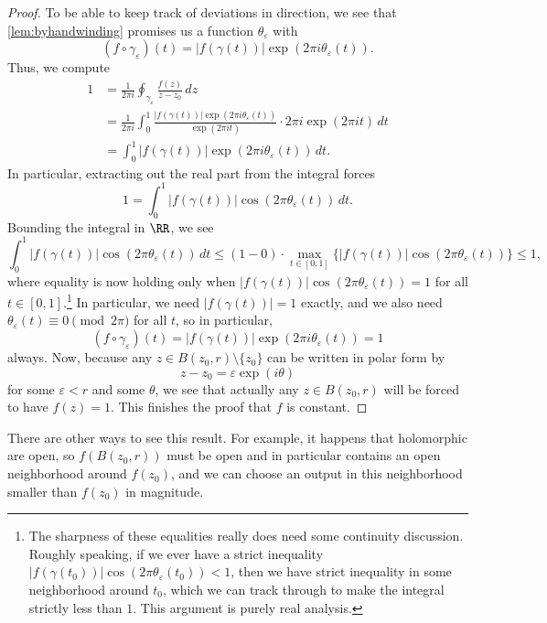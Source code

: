 \documentclass[../notes.tex]{subfiles}
\begin{document}
\begin{proof}
	To be able to keep track of deviations in direction, we see that \autoref{lem:byhandwinding} promises us a function $\theta_\varepsilon$ with
	\[(f\circ\gamma_\varepsilon)(t)=|f(\gamma(t))|\exp(2\pi i\theta_\varepsilon(t)).\]
	Thus, we compute
	\begin{align*}
		1 &= \frac1{2\pi i}\oint_{\gamma_\varepsilon}\frac{f(z)}{z-z_0}\,dz \\
		&= \frac1{2\pi i}\int_0^1\frac{|f(\gamma(t))|\exp(2\pi i\theta_\varepsilon(t))}{\exp(2\pi it)}\cdot2\pi i\exp(2\pi it)\,dt \\
		&= \int_0^1|f(\gamma(t))|\exp(2\pi i\theta_\varepsilon(t))\,dt.
	\end{align*}
	In particular, extracting out the real part from the integral forces
	\[1=\int_0^1|f(\gamma(t))|\cos(2\pi\theta_\varepsilon(t))\,dt.\]
	Bounding the integral in $\RR$, we see
	\[\int_0^1|f(\gamma(t))|\cos(2\pi\theta_\varepsilon(t))\,dt\le(1-0)\cdot\max_{t\in[0,1]}\big\{|f(\gamma(t))|\cos(2\pi\theta_\varepsilon(t))\big\}\le1,\]
	where equality is now holding only when $|f(\gamma(t))|\cos(2\pi\theta_\varepsilon(t))=1$ for all $t\in[0,1]$.\footnote{The sharpness of these equalities really does need some continuity discussion. Roughly speaking, if we ever have a strict inequality $|f(\gamma(t_0))|\cos(2\pi\theta_\varepsilon(t_0))<1$, then we have strict inequality in some neighborhood around $t_0$, which we can track through to make the integral strictly less than $1$. This argument is purely real analysis.} In particular, we need $|f(\gamma(t))|=1$ exactly, and we also need $\theta_\varepsilon(t)\equiv0\pmod{2\pi}$ for all $t$, so in particular,
	\[(f\circ\gamma_\varepsilon)(t)=|f(\gamma(t))|\exp(2\pi i\theta_\varepsilon(t))=1\]
	always. Now, because any $z\in B(z_0,r)\setminus\{z_0\}$ can be written in polar form by
	\[z-z_0=\varepsilon\exp(i\theta)\]
	for some $\varepsilon<r$ and some $\theta$, we see that actually any $z\in B(z_0,r)$ will be forced to have $f(z)=1$. This finishes the proof that $f$ is constant.
\end{proof}
\begin{remark}[Nir]
	There are other ways to see this result. For example, it happens that holomorphic are open, so $f(B(z_0,r))$ must be open and in particular contains an open neighborhood around $f(z_0)$, and we can choose an output in this neighborhood smaller than $f(z_0)$ in magnitude.
\end{remark}
\end{document}
